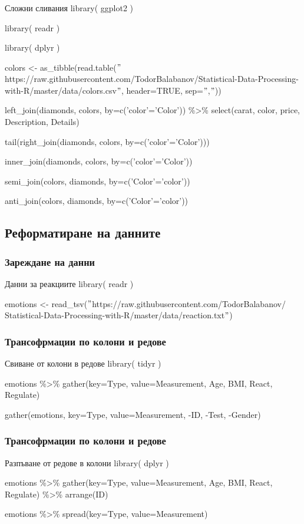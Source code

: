 \documentclass{beamer}
\begin{document}
\begin{frame}
\frametitle{}
\begin{block}{Сложни сливания}
library( ggplot2 )

library( readr )

library( dplyr )

colors <- as\_tibble(read.table($"$https://raw.githubusercontent.com/TodorBalabanov/Statistical-Data-Processing-with-R/master/data/colors.csv$"$, header=TRUE, sep=$"$,$"$))

left\_join(diamonds, colors, by=c('color'='Color')) \%>\% select(carat, color, price, Description, Details)

tail(right\_join(diamonds, colors, by=c('color'='Color')))

inner\_join(diamonds, colors, by=c('color'='Color'))

semi\_join(colors, diamonds, by=c('Color'='color'))

anti\_join(colors, diamonds, by=c('Color'='color'))
\end{block}
\end{frame}

\subsection{Реформатиране на данните}

\begin{frame}
\frametitle{Зареждане на данни}
\begin{block}{Данни за реакциите}
library( readr )

emotions <- read\_tsv($"$https://raw.githubusercontent.com/TodorBalabanov/ Statistical-Data-Processing-with-R/master/data/reaction.txt$"$)
\end{block}
\end{frame}

\begin{frame}
\frametitle{Трансофрмации по колони и редове}
\begin{block}{Свиване от колони в редове}
library( tidyr )

emotions \%>\% gather(key=Type, value=Measurement, Age, BMI, React, Regulate)

gather(emotions, key=Type, value=Measurement, -ID, -Test, -Gender)
\end{block}
\end{frame}

\begin{frame}
\frametitle{Трансофрмации по колони и редове}
\begin{block}{Разпъване от редове в колони}
library( dplyr )

emotions \%>\% gather(key=Type, value=Measurement, Age, BMI, React, Regulate) \%>\% arrange(ID)

emotions \%>\% spread(key=Type, value=Measurement)
\end{block}
\end{frame}
\end{document}
